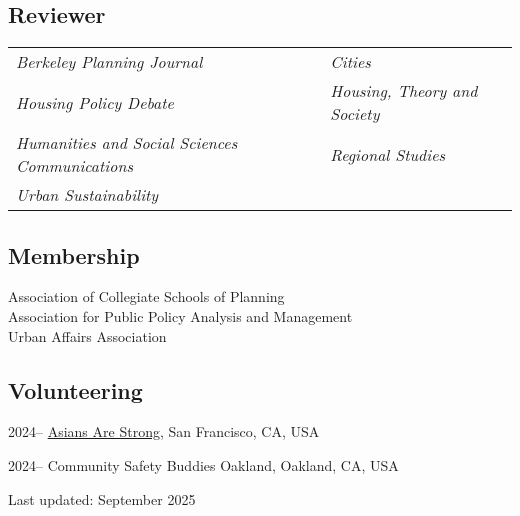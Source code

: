 \documentclass[11pt,letterpaper]{article}
\begin{document}
\subsection{Reviewer}
\begin{tabular}{@{}p{} p{}@{}}
\emph{Berkeley Planning Journal} & \emph{Cities}\\
\emph{Housing Policy Debate} & \emph{Housing, Theory and Society}\\
\emph{Humanities and Social Sciences Communications} & \emph{Regional Studies}\\
\emph{Urban Sustainability} &
\end{tabular}

\subsection{Membership}
Association of Collegiate Schools of Planning\\
Association for Public Policy Analysis and Management\\
Urban Affairs Association

\subsection{Volunteering}
\begin{tablist}
  \item[2024– ] \tab{}\href{https://asiansarestrong.org/}{Asians Are Strong}, San Francisco, CA, USA
  \item[2024– ] \tab{}Community Safety Buddies Oakland, Oakland, CA, USA
\end{tablist}

\vspace{1.0\baselineskip}
{\footnotesize Last updated: September 2025}
\end{document}
